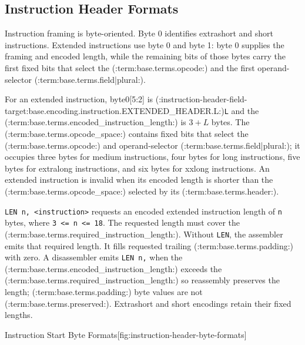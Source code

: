 \subsection{Instruction Header Formats}

Instruction framing is byte-oriented. Byte 0 identifies extrashort and short instructions. Extended
instructions use byte 0 and byte 1: byte 0 supplies the framing and encoded length, while the remaining
bits of those bytes carry the first fixed bits that select the (:term:base.terms.opcode:) and the first
operand-selector (:term:base.terms.field|plural:).

For an extended instruction, byte0[5:2] is (:instruction-header-field-target:base.encoding.instruction.EXTENDED_HEADER.L:)\texttt{L} and the (:term:base.terms.encoded_instruction_length:) is $3+L$ bytes. The
(:term:base.terms.opcode_space:) contains fixed bits that select the (:term:base.terms.opcode:) and operand-selector (:term:base.terms.field|plural:);
it occupies three bytes for medium instructions, four bytes for long instructions, five bytes for extralong
instructions, and six bytes for xxlong instructions. An extended instruction is invalid when its encoded
length is shorter than the (:term:base.terms.opcode_space:) selected by its (:term:base.terms.header:).

\texttt{LEN n, <instruction>} requests an encoded extended instruction length of \texttt{n} bytes, where
\texttt{3 <= n <= 18}. The requested length must cover the (:term:base.terms.required_instruction_length:). Without \texttt{LEN}, the
assembler emits that required length. It fills requested trailing (:term:base.terms.padding:) with zero. A disassembler emits
\texttt{LEN n,} when the (:term:base.terms.encoded_instruction_length:) exceeds the (:term:base.terms.required_instruction_length:) so reassembly preserves
the length; (:term:base.terms.padding:) byte values are not (:term:base.terms.preserved:). Extrashort and short encodings retain their fixed lengths.

\begin{BedrockListedBitDiagram}{Instruction Start Byte Formats}[fig:instruction-header-byte-formats]
\end{BedrockListedBitDiagram}

